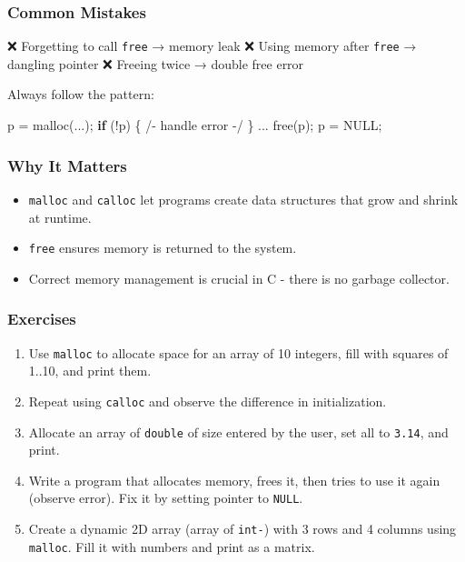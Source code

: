 \documentclass[
  letterpaper,
  DIV=11,
  numbers=noendperiod]{scrreprt}
\newenvironment{Shaded}{\begin{snugshade}}{\end{snugshade}}
\newcommand{\ControlFlowTok}[1]{\textcolor[rgb]{0.00,0.23,0.31}{\textbf{#1}}}
\newcommand{\NormalTok}[1]{\textcolor[rgb]{0.00,0.23,0.31}{#1}}
\newcommand{\OperatorTok}[1]{\textcolor[rgb]{0.37,0.37,0.37}{#1}}
\providecommand{\tightlist}{%
  \setlength{\itemsep}{0pt}\setlength{\parskip}{0pt}}
\begin{document}
\subsubsection{Common Mistakes}\label{common-mistakes-1}

❌ Forgetting to call \texttt{free} → memory leak ❌ Using memory after
\texttt{free} → dangling pointer ❌ Freeing twice → double free error

Always follow the pattern:

\begin{Shaded}
\begin{Highlighting}[]
\NormalTok{p }\OperatorTok{=}\NormalTok{ malloc}\OperatorTok{(...);}
\ControlFlowTok{if} \OperatorTok{(!}\NormalTok{p}\OperatorTok{)} \OperatorTok{\{} \OperatorTok{/{-}}\NormalTok{ handle error }\OperatorTok{{-}/} \OperatorTok{\}}
\OperatorTok{...}
\NormalTok{free}\OperatorTok{(}\NormalTok{p}\OperatorTok{);}
\NormalTok{p }\OperatorTok{=}\NormalTok{ NULL}\OperatorTok{;}
\end{Highlighting}
\end{Shaded}

\subsubsection{Why It Matters}\label{why-it-matters-40}

\begin{itemize}
\tightlist
\item
  \texttt{malloc} and \texttt{calloc} let programs create data
  structures that grow and shrink at runtime.
\item
  \texttt{free} ensures memory is returned to the system.
\item
  Correct memory management is crucial in C - there is no garbage
  collector.
\end{itemize}

\subsubsection{Exercises}\label{exercises-41}

\begin{enumerate}
\def\labelenumi{\arabic{enumi}.}
\tightlist
\item
  Use \texttt{malloc} to allocate space for an array of 10 integers,
  fill with squares of 1..10, and print them.
\item
  Repeat using \texttt{calloc} and observe the difference in
  initialization.
\item
  Allocate an array of \texttt{double} of size entered by the user, set
  all to \texttt{3.14}, and print.
\item
  Write a program that allocates memory, frees it, then tries to use it
  again (observe error). Fix it by setting pointer to \texttt{NULL}.
\item
  Create a dynamic 2D array (array of \texttt{int-}) with 3 rows and 4
  columns using \texttt{malloc}. Fill it with numbers and print as a
  matrix.
\end{enumerate}
\end{document}
